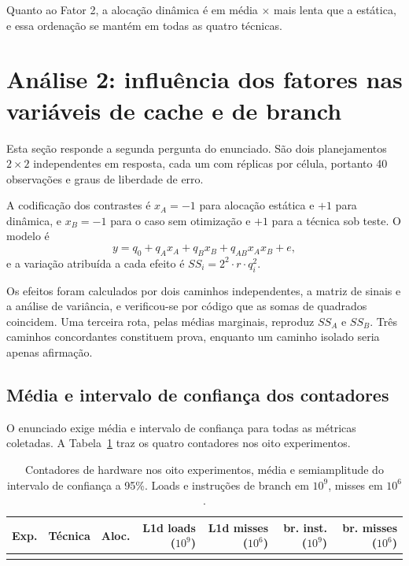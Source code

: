 \documentclass[11pt,a4paper]{article}
\begin{document}
Quanto ao Fator 2, a alocação dinâmica é em média \valRazaoAloc$\times$ mais lenta que a
estática, e essa ordenação se mantém em todas as quatro técnicas.

\section{Análise 2: influência dos fatores nas variáveis de cache e de branch}
\label{sec:analise2}

Esta seção responde a segunda pergunta do enunciado. São dois planejamentos $2\times2$
independentes em resposta, cada um com \valReplicas{} réplicas por célula, portanto 40
observações e \valFatUmGlErro{} graus de liberdade de erro.

A codificação dos contrastes é $x_A = -1$ para alocação estática e $+1$ para dinâmica, e
$x_B = -1$ para o caso sem otimização e $+1$ para a técnica sob teste. O modelo é
\begin{equation}
y = q_0 + q_A x_A + q_B x_B + q_{AB} x_A x_B + e,
\end{equation}
e a variação atribuída a cada efeito é $SS_i = 2^2 \cdot r \cdot q_i^2$.

Os efeitos foram calculados por dois caminhos independentes, a matriz de sinais e a
análise de variância, e verificou-se por código que as somas de quadrados coincidem. Uma
terceira rota, pelas médias marginais, reproduz $SS_A$ e $SS_B$. Três caminhos
concordantes constituem prova, enquanto um caminho isolado seria apenas afirmação.

\subsection{Média e intervalo de confiança dos contadores}

O enunciado exige média e intervalo de confiança para todas as métricas coletadas. A
Tabela~\ref{tab:contadores} traz os quatro contadores nos oito experimentos.

\begin{table}[H]
\centering
\caption{Contadores de hardware nos oito experimentos, média e semiamplitude do intervalo
de confiança a 95\%. Loads e instruções de branch em $10^9$, misses em $10^6$.}
\label{tab:contadores}
\scriptsize
\begin{tabular}{@{}cllrrrr@{}}
\toprule
\textbf{Exp.} & \textbf{Técnica} & \textbf{Aloc.} & \textbf{L1d loads ($10^9$)} &
\textbf{L1d misses ($10^6$)} & \textbf{br. inst. ($10^9$)} &
\textbf{br. misses ($10^6$)} \\
\midrule
\\
\bottomrule
\end{tabular}
\end{table}
\end{document}
